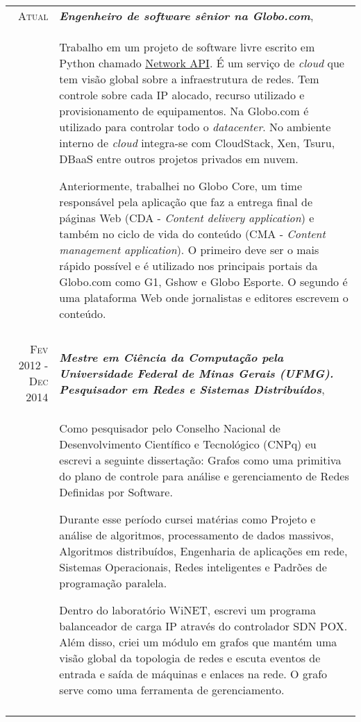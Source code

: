\documentclass[a4paper,10pt]{article} %
\begin{document}
\begin{tabular}{r|p{11cm}}

\textsc{Atual} & \emph{\bf Engenheiro de software sênior na Globo.com}, \\
& \footnotesize{Trabalho em um projeto de software livre escrito em Python
    chamado \href{https://github.com/globocom/GloboNetworkAPI}{Network API}.
    É um serviço de \emph{cloud} que tem visão global sobre a infraestrutura
    de redes. Tem controle sobre cada IP alocado, recurso utilizado e
    provisionamento de equipamentos. Na Globo.com é utilizado para controlar
    todo o \emph{datacenter}. No ambiente interno de \emph{cloud} integra-se
    com CloudStack, Xen, Tsuru, DBaaS entre outros projetos privados em nuvem.

    Anteriormente, trabalhei no Globo Core, um time responsável pela aplicação
    que faz a entrega final de páginas Web (CDA - \emph{Content delivery
    application}) e também no ciclo de vida do conteúdo (CMA - \emph{Content
    management application}). O primeiro deve ser o mais rápido possível e
    é utilizado nos principais portais da Globo.com como G1, Gshow e Globo
    Esporte. O segundo é uma plataforma Web onde jornalistas e editores
    escrevem o conteúdo.} \\
\multicolumn{2}{c}{} \\

\textsc{Fev 2012 - Dec 2014} & \emph{\bf Mestre em Ciência da Computação pela
    Universidade Federal de Minas Gerais (UFMG). Pesquisador em
Redes e Sistemas Distribuídos}, \\
& \footnotesize{Como pesquisador pelo Conselho Nacional de Desenvolvimento
    Científico e Tecnológico (CNPq) eu escrevi a seguinte dissertação: Grafos
    como uma primitiva do plano de controle para análise e gerenciamento de
    Redes Definidas por Software.

    Durante esse período cursei matérias como Projeto e análise de algoritmos,
    processamento de dados massivos, Algoritmos distribuídos, Engenharia de
    aplicações em rede, Sistemas Operacionais, Redes inteligentes e Padrões de
    programação paralela.

    Dentro do laboratório WiNET, escrevi um programa balanceador de carga IP
    através do controlador SDN POX. Além disso, criei um módulo em grafos que
    mantém uma visão global da topologia de redes e escuta eventos de entrada
    e saída de máquinas e enlaces na rede. O grafo serve como uma ferramenta de
    gerenciamento.} \\
\multicolumn{2}{c}{} \\


\end{tabular}
\end{document}

